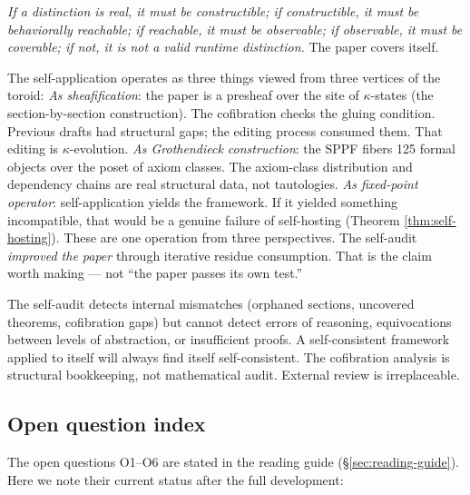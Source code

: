 \emph{If a distinction is real, it must be constructible;
if constructible, it must be behaviorally reachable; if
reachable, it must be observable; if observable, it must
be coverable; if not, it is not a valid runtime
distinction.} The paper covers itself.

The self-application operates as three things viewed from
three vertices of the toroid:
\emph{As sheafification}: the paper is a presheaf over
the site of $\kappa$-states (the section-by-section
construction). The cofibration checks the gluing condition.
Previous drafts had structural gaps; the editing process
consumed them. That editing is $\kappa$-evolution.
\emph{As Grothendieck construction}: the SPPF fibers
125 formal objects over the poset of axiom classes.
The axiom-class distribution and dependency chains are
real structural data, not tautologies.
\emph{As fixed-point operator}: self-application yields
the framework. If it yielded something incompatible,
that would be a genuine failure of self-hosting
(Theorem \ref{thm:self-hosting}).
These are one operation from three perspectives.
The self-audit \emph{improved the paper} through
iterative residue consumption. That is the claim worth
making --- not ``the paper passes its own test.''

\begin{remark}
The self-audit detects internal mismatches (orphaned
sections, uncovered theorems, cofibration gaps) but
cannot detect errors of reasoning, equivocations
between levels of abstraction, or insufficient proofs.
A self-consistent framework applied to itself will
always find itself self-consistent. The cofibration
analysis is structural bookkeeping, not mathematical
audit. External review is irreplaceable.
\end{remark}


\subsection{Open question index}
\label{sec:open-questions}

The open questions O1--O6 are stated in the reading guide
(\S\ref{sec:reading-guide}). Here we note their current
status after the full development:


